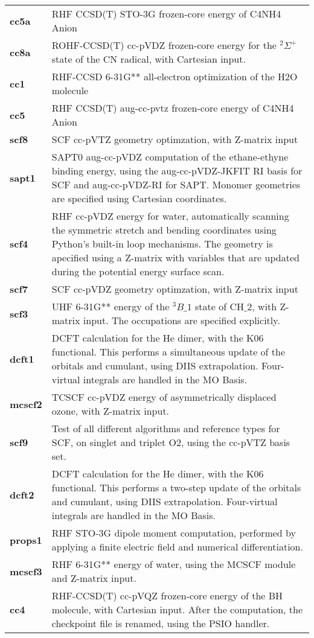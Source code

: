 \begin{tabular*}{\textwidth}[tb]{p{}p{}}
{\bf cc5a} &  RHF CCSD(T) STO-3G frozen-core energy of C4NH4 Anion\\
{\bf cc8a} &  ROHF-CCSD(T) cc-pVDZ frozen-core energy for the $^2\Sigma^+$ state of the CN radical, with Cartesian input.\\
{\bf cc1} &  RHF-CCSD 6-31G** all-electron optimization of the H2O molecule\\
{\bf cc5} &  RHF CCSD(T) aug-cc-pvtz frozen-core energy of C4NH4 Anion\\
{\bf scf8} &  SCF cc-pVTZ geometry optimzation, with Z-matrix input\\
{\bf sapt1} &  SAPT0 aug-cc-pVDZ computation of the ethane-ethyne binding energy, using the aug-cc-pVDZ-JKFIT RI basis for SCF and aug-cc-pVDZ-RI for SAPT.  Monomer geometries are specified using Cartesian coordinates.\\
{\bf scf4} &  RHF cc-pVDZ energy for water, automatically scanning the symmetric stretch and bending coordinates using Python's built-in loop mechanisms.  The geometry is apecified using a Z-matrix with variables that are updated during the potential energy surface scan.\\
{\bf scf7} &  SCF cc-pVDZ geometry optimzation, with Z-matrix input\\
{\bf scf3} &  UHF 6-31G** energy of the $^3B\_1$ state of CH$\_2$, with Z-matrix input. The occupations are specified explicitly.\\
{\bf dcft1} &  DCFT calculation for the He dimer, with the K06 functional. This performs a simultaneous update of the orbitals and cumulant, using DIIS extrapolation. Four-virtual integrals are handled in the MO Basis.\\
{\bf mcscf2} &  TCSCF cc-pVDZ  energy of asymmetrically displaced ozone, with Z-matrix input.\\
{\bf scf9} &  Test of all different algorithms and reference types for SCF, on singlet and triplet O2, using the cc-pVTZ basis set.\\
{\bf dcft2} &  DCFT calculation for the He dimer, with the K06 functional. This performs a two-step update of the orbitals and cumulant, using DIIS extrapolation. Four-virtual integrals are handled in the MO Basis.\\
{\bf props1} &  RHF STO-3G dipole moment computation, performed by applying a finite electric field and numerical differentiation.\\
{\bf mcscf3} &  RHF 6-31G** energy of water, using the MCSCF module and Z-matrix input.\\
{\bf cc4} &  RHF-CCSD(T) cc-pVQZ frozen-core energy of the BH molecule, with Cartesian input. After the computation, the checkpoint file is renamed, using the PSIO handler.\\
\end{tabular*}